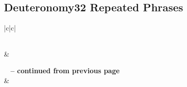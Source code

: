 \subsection{Deuteronomy32 Repeated Phrases}


\normalsize
 
\begin{center}
\begin{longtable}{|c|c|}
\caption[Deuteronomy32 Repeated Phrases]{Deuteronomy32 Repeated Phrases}\label{table:Repeated Phrases Deuteronomy32} \\
\hline {} &  \\ \hline 
\endfirsthead
 
{{\bfseries \tablename\ \thetable{} -- continued from previous page}} \\  
\hline {} &  \\ \hline 
\endhead
 

\end{longtable}
\end{center}
